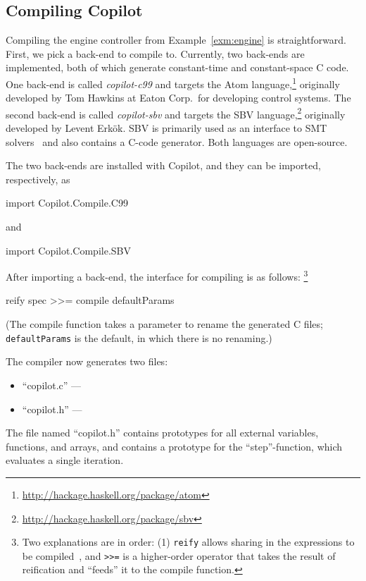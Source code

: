 \subsection{Compiling Copilot} \label{sec:compiling}

Compiling the engine controller from Example~\ref{exm:engine} is
straightforward. First, we pick a back-end to compile to. Currently, two
back-ends are implemented, both of which generate constant-time and
constant-space C code. One back-end is called \emph{copilot-c99} and targets
the Atom language,\footnote{\url{http://hackage.haskell.org/package/atom}}
originally developed by Tom Hawkins at Eaton Corp.\ for developing control
systems. The second back-end is called \emph{copilot-sbv} and targets the SBV
language,\footnote{\url{http://hackage.haskell.org/package/sbv}} originally
developed by Levent Erk\"{o}k. SBV is primarily used as an interface to SMT
solvers~\cite{smt} and also contains a C-code generator. Both languages are
open-source.

The two back-ends are installed with Copilot, and they can be imported,
respectively, as

\begin{code}
import Copilot.Compile.C99
\end{code}
\noindent
and
\begin{code}
import Copilot.Compile.SBV
\end{code}

After importing a back-end, the interface for compiling is as
follows:
%
\footnote{Two explanations are in order: (1) {\tt reify} allows sharing in the
expressions to be compiled~\cite{DSLExtract}, and {\tt >>=} is a higher-order
operator that takes the result of reification and ``feeds'' it to the compile
function.}
%
\begin{code}
reify spec >>= compile defaultParams
\end{code}
%
\noindent
(The compile function takes a parameter to rename the generated C files; {\tt
defaultParams} is the default, in which there is no renaming.)

The compiler now generates two files:

\begin{itemize}
\item ``copilot.c'' ---
\item ``copilot.h'' ---
\end{itemize}

The file named ``copilot.h'' contains prototypes for all external variables,
functions, and arrays, and contains a prototype for the ``step''-function,
which evaluates a single iteration.


